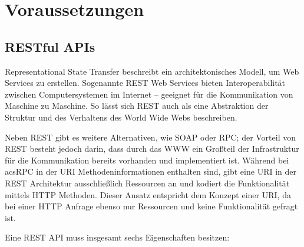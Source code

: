 \chapter{Voraussetzungen}
	
	\section{RESTful APIs} %
	
		Representational State Transfer beschreibt ein architektonisches Modell, um Web Services zu erstellen. Sogenannte \acs{REST} Web Services bieten Interoperabilität zwischen Computersystemen im Internet -- geeignet für die Kommunikation von Maschine zu Maschine. So lässt sich REST auch als eine Abstraktion der Struktur und des Verhaltens des World Wide Webs beschreiben. 
		
		Neben REST gibt es weitere Alternativen, wie \acs{SOAP} oder \acs{RPC}; der Vorteil von REST besteht jedoch darin, dass durch das \acs{WWW} ein Großteil der Infrastruktur für die Kommunikation bereits vorhanden und implementiert ist. Während bei \\acs{RPC} in der \acs{URI} Methodeninformationen enthalten sind, gibt eine \acs{URI} in der \acs{REST} Architektur ausschließlich Ressourcen an und kodiert die Funktionalität mittels \acs{HTTP} Methoden. Dieser Ansatz entspricht dem Konzept einer \acs{URI}, da bei einer \acs{HTTP} Anfrage ebenso nur Ressourcen und keine Funktionalität gefragt ist.
		
		Eine REST API muss insgesamt sechs Eigenschaften besitzen:
		
